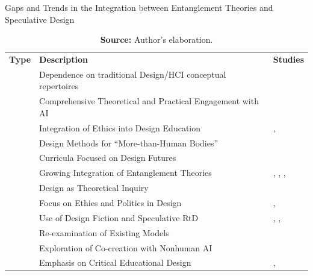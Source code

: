\begin{table}[ht!]
\centering
\scriptsize
\caption{Gaps and Trends in the Integration between Entanglement Theories and Speculative Design}
\begin{tabular}{
    >{\raggedright\arraybackslash}p{1.0cm} 
    >{\raggedright\arraybackslash}p{7.2cm} 
    >{\raggedright\arraybackslash}p{5.3cm}
}

\toprule
\textbf{Type} & \textbf{Description} & \textbf{Studies} \\
\cmidrule[0.4pt]{1-3}

\multirow{6}{*}{Gaps}
  & Dependence on traditional Design/HCI conceptual repertoires & \cite{wakkary2022two} \\
  & Comprehensive Theoretical and Practical Engagement with AI & \cite{benjamin2023entoptic} \\
  & Integration of Ethics into Design Education & \cite{forlano2023speculative}, \cite{homewood2021tracing} \\
  & Design Methods for ``More-than-Human Bodies'' & \cite{homewood2021tracing} \\
  & Curricula Focused on Design Futures & \cite{forlano2023speculative} \\
\arrayrulecolor{gray}
\cmidrule(l{0pt}r{0pt}){1-3}
\arrayrulecolor{black}

\multirow{7}{*}{Trends}
  & Growing Integration of Entanglement Theories & \cite{dorrenbacher2023intricacies}, \cite{bekker2023challenges}, \cite{calderwood2024designing}, \cite{encinas2020metaprobes} \\
  & Design as Theoretical Inquiry & \cite{forlano2023speculative} \\
  & Focus on Ethics and Politics in Design & \cite{homewood2021tracing}, \cite{henry2024theorizing} \\
  & Use of Design Fiction and Speculative RtD & \cite{benjamin2023entoptic}, \cite{dorrenbacher2023intricacies}, \cite{encinas2020metaprobes} \\
  & Re-examination of Existing Models & \cite{henry2024theorizing} \\
  & Exploration of Co-creation with Nonhuman AI & \cite{tholander2023design} \\
  & Emphasis on Critical Educational Design & \cite{forlano2023speculative}, \cite{bekker2023challenges} \\

\bottomrule
\end{tabular}
\label{tab:lacunas_tendencias_emaranhado_de}
\caption*{\textbf{Source:} Author’s elaboration.}
\end{table}

